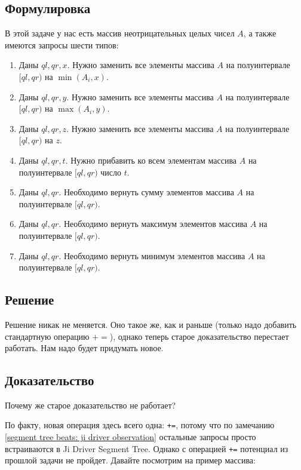\subsection{Формулировка}

В этой задаче у нас есть массив неотрицательных целых чисел $A$, а также имеются запросы шести типов:

\begin{enumerate}
    \item Даны $ql, qr, x$. Нужно заменить все элементы массива $A$ на полуинтервале $[ql, qr)$ на $\min(A_i, x)$.
    \item Даны $ql, qr, y$. Нужно заменить все элементы массива $A$ на полуинтервале $[ql, qr)$ на $\max(A_i, y)$.
    \item Даны $ql, qr, z$. Нужно заменить все элементы массива $A$ на полуинтервале $[ql, qr)$ на $z$.
    \item Даны $ql, qr, t$. Нужно прибавить ко всем элементам массива $A$ на полуинтервале $[ql, qr)$ число $t$.
    \item Даны $ql, qr$. Необходимо вернуть сумму элементов массива $A$ на полуинтервале $[ql, qr)$.
    \item Даны $ql, qr$. Необходимо вернуть максимум элементов массива $A$ на полуинтервале $[ql, qr)$.
    \item Даны $ql, qr$. Необходимо вернуть минимум элементов массива $A$ на полуинтервале $[ql, qr)$.
\end{enumerate}


\subsection{Решение}

Решение никак не меняется. Оно такое же, как и раньше (только надо добавить стандартную операцию $+=$), однако теперь старое доказательство перестает работать. Нам надо будет придумать новое.

\subsection{Доказательство}
Почему же старое доказательство не работает?

По факту, новая операция здесь всего одна: \verb^+=^, потому что по замечанию \ref{segment tree beats: ji driver observation} остальные запросы просто встраиваются в Ji Driver Segment Tree. Однако с операцией \verb^+=^ потенциал из прошлой задачи не пройдет. Давайте посмотрим на пример массива:

